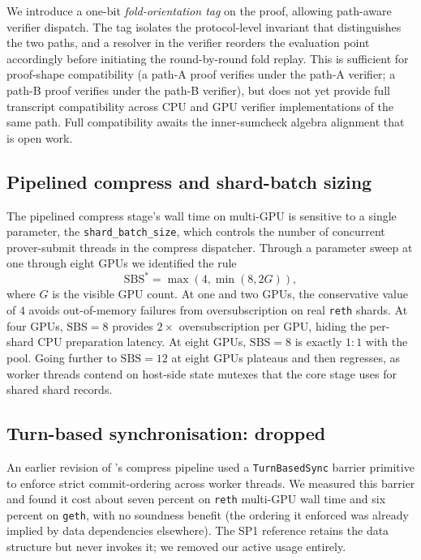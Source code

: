 We introduce a one-bit \emph{fold-orientation tag} on the proof, allowing path-aware verifier dispatch. The tag isolates the protocol-level invariant that distinguishes the two paths, and a resolver in the verifier reorders the evaluation point accordingly before initiating the round-by-round fold replay. This is sufficient for proof-shape compatibility (a path-A proof verifies under the path-A verifier; a path-B proof verifies under the path-B verifier), but does not yet provide full transcript compatibility across CPU and GPU verifier implementations of the same path. Full compatibility awaits the inner-sumcheck algebra alignment that is open work.

\subsection{Pipelined compress and shard-batch sizing}

The pipelined compress stage's wall time on multi-GPU is sensitive to a single parameter, the \texttt{shard\_batch\_size}, which controls the number of concurrent prover-submit threads in the compress dispatcher. Through a parameter sweep at one through eight GPUs we identified the rule
\begin{equation}
  \mathrm{SBS}^* = \max(4, \min(8, 2G)),
\end{equation}
where $G$ is the visible GPU count. At one and two GPUs, the conservative value of $4$ avoids out-of-memory failures from oversubscription on real \texttt{reth} shards. At four GPUs, $\mathrm{SBS} = 8$ provides $2\times$ oversubscription per GPU, hiding the per-shard CPU preparation latency. At eight GPUs, $\mathrm{SBS} = 8$ is exactly $1:1$ with the pool. Going further to $\mathrm{SBS} = 12$ at eight GPUs plateaus and then regresses, as worker threads contend on host-side state mutexes that the core stage uses for shared shard records.

\subsection{Turn-based synchronisation: dropped}

An earlier revision of \Zirenver{}'s compress pipeline used a \texttt{TurnBasedSync} barrier primitive to enforce strict commit-ordering across worker threads. We measured this barrier and found it cost about seven percent on \texttt{reth} multi-GPU wall time and six percent on \texttt{geth}, with no soundness benefit (the ordering it enforced was already implied by data dependencies elsewhere). The SP1 reference retains the data structure but never invokes it; we removed our active usage entirely.

